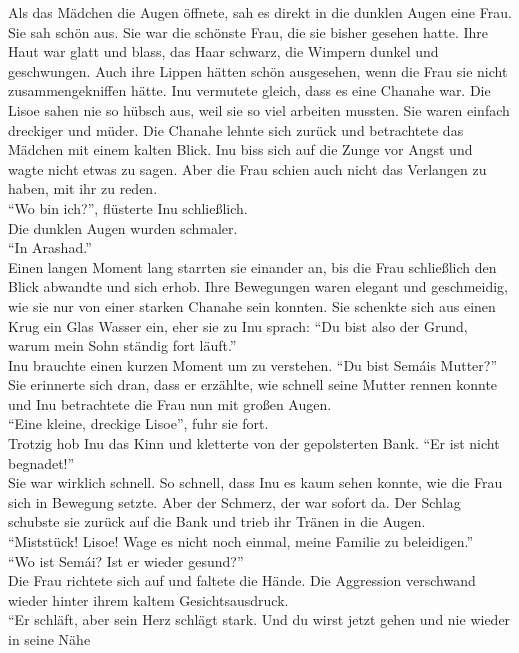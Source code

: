 \documentclass[a4paper,12pt]{book}
\begin{document}
Als das Mädchen die Augen öffnete, sah es direkt in die dunklen Augen eine Frau. Sie sah schön aus. 
Sie war die schönste Frau, die sie bisher gesehen hatte. Ihre Haut war glatt und blass, das Haar 
schwarz, die Wimpern dunkel und geschwungen. Auch ihre Lippen hätten schön ausgesehen, wenn die 
Frau sie nicht zusammengekniffen hätte. Inu vermutete gleich, dass es eine Chanahe war. Die Lisoe 
sahen nie so hübsch aus, weil sie so viel arbeiten mussten. Sie waren einfach dreckiger und müder. 
Die Chanahe lehnte sich zurück und betrachtete das Mädchen mit einem kalten Blick. Inu biss sich 
auf die Zunge vor Angst und wagte nicht etwas zu sagen. Aber die Frau schien auch nicht das 
Verlangen zu haben, mit ihr zu reden. \\
``Wo bin ich?'', flüsterte Inu schließlich.\\
Die dunklen Augen wurden schmaler.\\
``In Arashad.''\\
Einen langen Moment lang starrten sie einander an, bis die Frau schließlich den Blick abwandte und 
sich erhob. Ihre Bewegungen waren elegant und geschmeidig, wie sie nur von einer starken Chanahe 
sein konnten. Sie schenkte sich aus einen Krug ein Glas Wasser ein, eher sie zu Inu sprach: ``Du 
bist also der Grund, warum mein Sohn ständig fort läuft.''\\
Inu brauchte einen kurzen Moment um zu verstehen. ``Du bist Semáis Mutter?''\\
Sie erinnerte sich dran, dass er erzählte, wie schnell seine Mutter rennen konnte und Inu 
betrachtete die Frau nun mit großen Augen. \\
``Eine kleine, dreckige Lisoe'', fuhr sie fort.\\
Trotzig hob Inu das Kinn und kletterte von der gepolsterten Bank. ``Er ist nicht begnadet!''\\
Sie war wirklich schnell. So schnell, dass Inu es kaum sehen konnte, wie die Frau sich in Bewegung 
setzte. Aber der Schmerz, der war sofort da. Der Schlag schubste sie zurück auf die Bank und 
trieb ihr Tränen in die Augen. \\
``Miststück! Lisoe! Wage es nicht noch einmal, meine Familie zu beleidigen.''\\
``Wo ist Semái? Ist er wieder gesund?''\\
Die Frau richtete sich auf und faltete die Hände. Die Aggression verschwand wieder hinter ihrem 
kaltem Gesichtsausdruck. \\
``Er schläft, aber sein Herz schlägt stark. Und du wirst jetzt gehen und nie wieder in seine Nähe 
\end{document}
